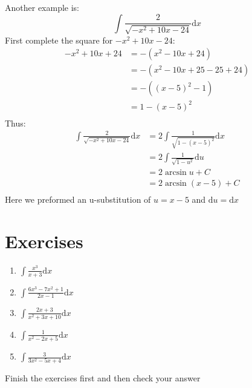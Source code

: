 \documentclass{article}
\numberwithin{equation}{section}
\begin{document}
Another example is:
\[
\int \frac{2}{\sqrt{-x^2 + 10x - 24}}\mathrm{d}x
\]
First complete the square for $-x^2 + 10 x -24$:
\begin{align*}
    -x^2 + 10x + 24 &= -(x^2 - 10x + 24)\\
    &= - (x^2 - 10x + 25 -25 + 24)\\
    &=-((x-5)^2 - 1)\\
    &= 1-(x-5)^2\\
\end{align*}
Thus:
\begin{align*}
    \int \frac{2}{\sqrt{-x^2 + 10x - 24}}\mathrm{d}x &= 2\int \frac{1}{\sqrt{1-(x-5)^2}} \mathrm{d}x\\
    &= 2\int \frac{1}{\sqrt{1-u^2}}\mathrm{d}u\\
    &= 2 \arcsin{u} + C\\
    &= 2\arcsin{(x-5)} +C\\
\end{align*}
Here we preformed an u-substitution of $u=x-5$ and $\mathrm{d}u = \mathrm{d}x$

\section{Exercises}
\begin{enumerate}
    \item $\displaystyle \int \frac{x^3}{x+3}\mathrm{d}x$
    \item $\displaystyle \int \frac{6x^3-7x^2+1}{2x-1}\mathrm{d}x$
    \item $\displaystyle \int \frac{2x+3}{x^2 + 3x + 10}\mathrm{d}x$
    \item $\displaystyle \int \frac{1}{x^2-2x+5}\mathrm{d}x$
    \item $\displaystyle \int \frac{3}{3x^2-5x+4}\mathrm{d}x$
\end{enumerate}
Finish the exercises first and then check your answer
\end{document}
